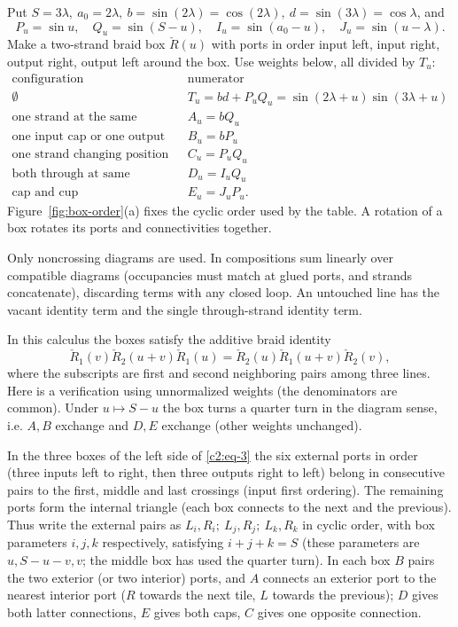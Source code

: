 Put \(S=3\lambda,\ a_0=2\lambda,\ b=\sin(2\lambda)=\cos(2\lambda),\ d=\sin(3\lambda)=\cos\lambda\), and
\[
 P_u=\sin u,\quad Q_u=\sin(S-u),\quad I_u=\sin(a_0-u),\quad J_u=\sin(u-\lambda).
\]
Make a two-strand braid box \(\check R(u)\) with ports in order input left, input right, output right, output left around the box. Use weights below, all divided by \(T_u\):
\[
\begin{array}{c|c}
\text{configuration}&\text{numerator}\\ \hline
\emptyset &T_u=bd+P_uQ_u=\sin(2\lambda+u)\sin(3\lambda+u)\\
\text{one strand at the same position in/out}& A_u=bQ_u\\
\text{one input cap or one output cup}& B_u=bP_u\\
\text{one strand changing position}& C_u=P_uQ_u\\
\text{both through at same positions}& D_u=I_u Q_u\\
\text{cap and cup}& E_u=J_u P_u .
\end{array}
\]
Figure~\ref{fig:box-order}(a) fixes the cyclic order used by the table.
A rotation of a box rotates its ports and connectivities together.

Only noncrossing diagrams are used. In compositions sum linearly over compatible diagrams (occupancies must match at glued ports, and strands concatenate), discarding terms with any closed loop. An untouched line has the vacant identity term and the single through-strand identity term.

In this calculus the boxes satisfy the additive braid identity
\begin{equation}
 \check R_1(v)\check R_2(u+v)\check R_1(u)=
 \check R_2(u)\check R_1(u+v)\check R_2(v),                              \label{c2:eq-3}
\end{equation}
where the subscripts are first and second neighboring pairs among three lines. Here is a verification using unnormalized weights (the denominators are common). Under \(u\mapsto S-u\) the box turns a quarter turn in the diagram sense, i.e. \(A,B\) exchange and \(D,E\) exchange (other weights unchanged). 

In the three boxes of the left side of \eqref{c2:eq-3} the six external ports in order (three inputs left to right, then three outputs right to left) belong in consecutive pairs to the first, middle and last crossings (input first ordering). The remaining ports form the internal triangle (each box connects to the next and the previous). Thus write the external pairs as \(L_i,R_i;\ L_j,R_j;\ L_k,R_k\) in cyclic order, with box parameters \(i,j,k\) respectively, satisfying \(i+j+k=S\) (these parameters are \(u,S-u-v,v\); the middle box has used the quarter turn). In each box \(B\) pairs the two exterior (or two interior) ports, and \(A\) connects an exterior port to the nearest interior port (\(R\) towards the next tile, \(L\) towards the previous); \(D\) gives both latter connections, \(E\) gives both caps, \(C\) gives one opposite connection. 

